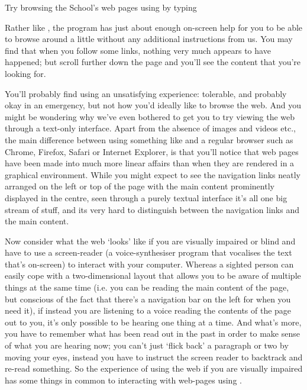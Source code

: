
Try browsing the School's web pages using  by typing


Rather like , the  program has just about enough on-screen help for you to be able to browse around a little without any additional instructions from us.  You may find that when you follow some links, nothing very much appears to have happened; but scroll further down the page and you'll see the content that you're looking for.

You'll probably find using  an unsatisfying experience: tolerable, and probably okay in an emergency, but not how you'd ideally like to browse the web. And you might be wondering why we've even bothered to get you to try viewing the web through a text-only interface. Apart from the absence of images and videos etc., the main difference between using something like  and a regular browser such as Chrome, Firefox, Safari or Internet Explorer, is that you'll notice that web pages have been made into much more linear affairs than when they are rendered in a graphical environment. While you might expect to see the navigation links neatly arranged on the left or top of the page with the main content prominently displayed in the centre, seen through a purely textual interface it's all one big stream of stuff, and its very hard to distinguish between the navigation links and the main content. 

Now consider what the web `looks' like if you are visually impaired or blind and have to use a screen-reader (a voice-synthesiser program that vocalises the text that's on-screen) to interact with your computer. Whereas a sighted person can easily cope with a two-dimensional layout that allows you to be aware of multiple things at the same time (i.e. you can be reading the main content of the page, but conscious of the fact that there's a navigation bar on the left for when you need it), if instead you are listening to a voice reading the contents of the page out to you, it's only possible to be hearing one thing at a time. And what's more, you have to remember what has been read out in the past in order to make sense of what you are hearing now; you can't just `flick back' a paragraph or two by moving your eyes, instead you have to instruct the screen reader to backtrack and re-read something. So the experience of using the web if you are visually impaired has some things in common to interacting with web-pages using . 

